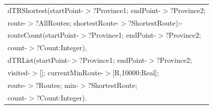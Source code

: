 \documentclass[a4paper,9pt]{beamer}
\begin{document}
{\begin{columns}[c]
\begin{figure} [tbph]
\begin{table} [b]
\begin{tabular}{|l|}
 dTRShortest(startPoint-$>$?Province1; endPoint-$>$?Province2; \\
\hspace{0.48in}route-$>$?AllRoutes; shortestRoute-$>$?ShortestRoute):-\\
\hspace{0.1in}routeCount(startPoint-$>$?Province1; endPoint-$>$?Province2;\\
\hspace{0.5in} count-$>$?Count:Integer),\\
\hspace{0.1in}dTRList(startPoint-$>$?Province1; endPoint-$>$?Province2; \\ 
\hspace{0.37in} visited-$>$[]; currentMinRoute-$>$[R,10000:Real];\\
\hspace{0.37in} route-$>$?Routes; min-$>$?ShortestRoute; \\
\hspace{0.37in} count-$>$?Count:Integer).\\
\hline
\end{tabular}
\end {table}
\end{figure} 
\end{columns}
}
\end{document}
